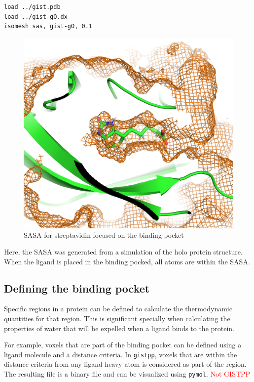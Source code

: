 \documentclass[9pt,tutorial]{livecoms}
\newcommand{\software}{\texttt}
\newcommand{\todo}{\textcolor{red}}
\begin{document}
\begin{lstlisting}[style=pymol]
load ../gist.pdb
load ../gist-gO.dx
isomesh sas, gist-gO, 0.1
\end{lstlisting}

\begin{figure}
	\centering
	\includegraphics[width=1.0\linewidth]{figures/sasa-simple.png}
	\caption{SASA for streptavidin focused on the binding pocket}\label{fig-streptavidin_sasa}
\end{figure}

Here, the SASA was generated from a simulation of the holo protein structure.
When the ligand is placed in the binding pocked, all atoms are within the SASA. 

\subsection{Defining the binding pocket}
Specific regions in a protein can be defined to calculate the thermodynamic quantities for that region.
This is significant specially when calculating the properties of water that will be expelled when a ligand binds to the protein.

For example, voxels that are part of the binding pocket can be defined using a ligand molecule and a distance criteria. In \software{gistpp}, voxels that are within the distance criteria from any ligand heavy atom is considered as part of the region. The resulting file is a binary file and can be visualized using \software{pymol}. \todo{Not GISTPP}
\end{document}
